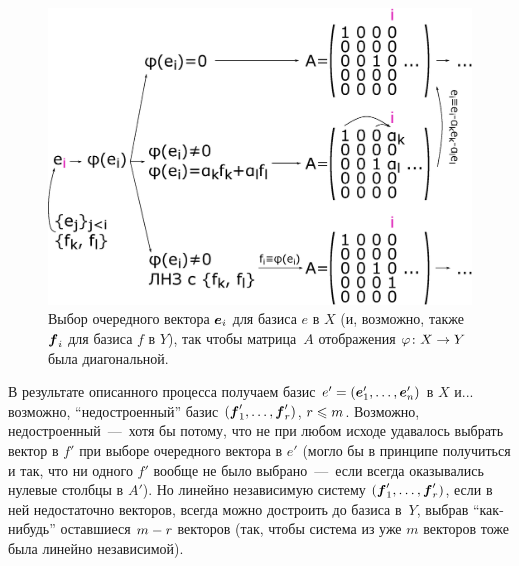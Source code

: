 \documentclass[a4paper,12pt]{article}
\begin{document}
  \begin{figure}[h]
    \centering
  
    \includegraphics[width=0.85\columnwidth]{map-x-y-diag-scheme}  %
  
    \caption{Выбор очередного вектора $\boldsymbol e_i$ для базиса $e$ в $X$ (и, возможно, также $\boldsymbol f_i$ для базиса $f$ в $Y$), так чтобы матрица~$A$ отображения $\phi\colon X \hm\to Y$ была диагональной.}
    \label{fig:map-x-y-diag-scheme}
  \end{figure}
  
  В результате описанного процесса получаем базис $e' \hm= (\bds e_1', \ldots, \bds e_n')$ в $X$ и... возможно, ``недостроенный'' базис $(\boldsymbol f_1', \ldots, \boldsymbol f_r')$, $r \hm\leq m$.
  Возможно, недостроенный~---~хотя бы потому, что не при любом исходе удавалось выбрать вектор в $f'$ при выборе очередного вектора в $e'$ (могло бы в принципе получиться и так, что ни одного $f'$ вообще не было выбрано~---~если всегда оказывались нулевые столбцы в $A'$).
  Но линейно независимую систему $(\boldsymbol f_1', \ldots, \boldsymbol f_r')$, если в ней недостаточно векторов, всегда можно достроить до базиса в~$Y$, выбрав ``как-нибудь'' оставшиеся $m \hm- r$ векторов (так, чтобы система из уже $m$ векторов тоже была линейно независимой).
  
\end{document}
